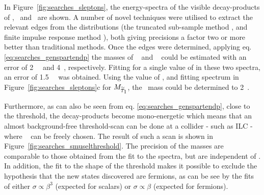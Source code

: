 In Figure~\ref{fig:searches_sleptons},
the energy-spectra of the visible decay-products of 
\selr , \smu~and \stone~are shown.
A number of novel techniques were utilised
to extract the relevant edges from the distributions
(the truncated sub-sample method  \cite{Berggren:2015qua},
and finite impulse response method \cite{Caiazza:416980}),
both giving precisions a factor two or more better than
traditional methods.
Once the edges were determined,
applying eq. \ref{eq:searches_genspartendp}
the masses of \selr~ and  \smur~ 
could be estimated with an error of 2~\permil~ and
4~\permil, respectively.
Fitting for a single value of  in these two spectra,
an error of 1.5~\permil~ was obtained.
Using the value of  ,
and fitting spectrum in Figure~\ref{fig:searches_sleptons}c for $M_{\mbox{$ \widetilde{\tau}_1 $}} $,
the  \stone~mass could be determined to 2~\permil.

Furthermore, 
as can also be seen from eq. \ref{eq:searches_genspartendp},
close to the threshold,
the decay-products become mono-energetic which means
that an almost background-free threshold-scan can be done
at a collider - such as ILC - where \Ecms~ can be freely chosen.
The result of such a scan is shown in Figure~\ref{fig:searches_smuselthreshold}.
The precision of the masses are comparable to those
obtained from the fit to the spectra,
but are independent of .
In addition,
the fit to the shape of the threshold makes it possible to
exclude the hypothesis that the new states discovered are
fermions,
as can be see by the fits of either $\sigma \propto \beta^3$ (expected for
scalars) or
 $\sigma \propto \beta$ (expected for fermions). 
 
